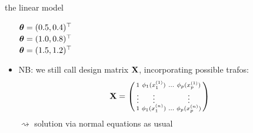 \documentclass[11pt,compress,t,notes=noshow, xcolor=table]{beamer}
\begin{document}
\begin{vbframe}{the linear model}
\begin{itemize}
\begin{minipage}[b]{0.2\textwidth}
  \tiny \raggedleft
  \textcolor{blue}{$\bm{\theta} = (0.5, 0.4)^\top$} \\
  \textcolor{orange}{$\bm{\theta} = (1.0, 0.8)^\top$} \\
  \textcolor{magenta}{$\bm{\theta} = (1.5, 1.2)^\top$} \\
  \vspace{0.1cm}
\end{minipage}

\vfill

\item NB: we still call design matrix $\mathbf{X}$, incorporating possible trafos:
\begin{align*}
  \mathbf{X} =
  \left(
    \begin{smallmatrix}
        1 & \textcolor{black}{\phi_1} (x^{(1)}_1) & \ldots &
        \textcolor{black}{\phi_p} (x^{(1)}_p) \\
        \vdots & \vdots & & \vdots \\
        1 & \textcolor{black}{\phi_1} (x^{(n)}_1) & \ldots &
        \textcolor{black}{\phi_p} (x^{(n)}_p) \\
    \end{smallmatrix}
    \right)
\end{align*}
$\rightsquigarrow$ solution via normal equations as usual
\end{itemize}

\end{vbframe}

\end{document}
